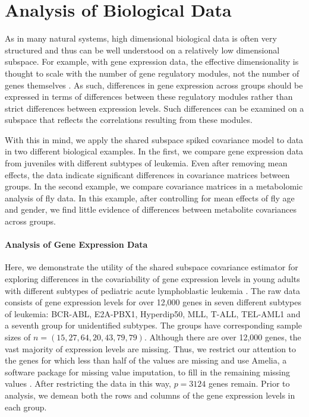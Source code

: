 \documentclass{article}
\begin{document}
\section{Analysis of Biological Data}

As in many natural systems, high dimensional biological data is often
very structured and thus can be well understood on a relatively low
dimensional subspace. For example, with gene expression
data, the effective dimensionality is thought to scale with the number
of gene regulatory modules, not the number of genes themselves
\citep{Heimberg2016}.  As such, differences in gene expression across
groups should be expressed in terms of differences between these
regulatory modules rather than strict differences between expression
levels.  Such differences can be examined on a subspace that reflects
the correlations resulting from these modules.

With this in mind, we apply the shared subspace spiked covariance model to data in two
different biological examples.  In the first, we compare gene
expression data from juveniles with different subtypes of leukemia.  Even
after removing mean effects, the data indicate significant differences
in covariance matrices between groups.  In the second example, we
compare covariance matrices in a metabolomic analysis of fly data.  In
this example, after controlling for mean effects of fly age and
gender, we find little evidence of differences between metabolite
covariances across groups. 

\paragraph{Analysis of Gene Expression Data}

Here, we demonstrate the utility of the shared subspace
covariance estimator for exploring differences in the covariability of
gene expression levels in young adults with different subtypes of
pediatric acute lymphoblastic leukemia \citep{Yeoh2002}.  The raw data
consists of gene expression levels for over 12,000 genes in seven
different subtypes of leukemia: BCR-ABL, E2A-PBX1, Hyperdip50, MLL,
T-ALL, TEL-AML1 and a seventh group for unidentified subtypes.  The
groups have corresponding sample sizes of
$n = (15, 27, 64, 20, 43, 79, 79)$.  Although there are over 12,000
genes, the vast majority of expression levels are missing.
Thus, we restrict our attention to the genes for which less than half
of the values are missing and use Amelia, a software package for
missing value imputation, to fill in the remaining missing values
\citep{Amelia}.  After restricting the data in this way, $p=3124$
genes remain.  Prior to analysis, we demean both the rows and columns of
the gene expression levels in each group.
\end{document}
